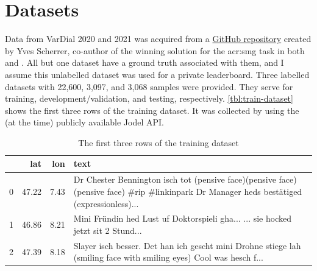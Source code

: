 \section{Datasets}
\label{sec:datasets}

Data from VarDial 2020 and 2021 was acquired from a \href{https://github.com/yvesscherrer/vardial-shared-tasks}{GitHub repository} created by Yves Scherrer, co-author of the winning solution for the \gls{acr:smg} task in both \citeyear{scherrerHeLjuVarDial20202020} and \citeyear{scherrerSocialMediaVariety2021}. All but one dataset have a ground truth associated with them, and I assume this unlabelled dataset was used for a private leaderboard. Three labelled datasets with 22,600, 3,097, and 3,068 samples were provided. They serve for training, development/validation, and testing, respectively. \autoref{tbl:train-dataset} shows the first three rows of the training dataset. It was collected by \cite[2-3]{hovyCapturingRegionalVariation2018} using the (at the time) publicly available Jodel API.

\begin{table}
    \centering
    \begin{tabular}{l|rr|p{}}
        \toprule
          & lat   & lon  & text                                                                                                                                        \\
        \midrule
        0 & 47.22 & 7.43 & Dr Chester Bennington isch tot (pensive face)(pensive face)(pensive face) \#rip \#linkinpark Dr Manager heds bestätiged (expressionless)... \\
        1 & 46.86 & 8.21 & Mini Fründin hed Lust uf Doktorspieli gha... ... sie hocked jetzt sit 2 Stund...                                                            \\
        2 & 47.39 & 8.18 & Slayer isch besser. Det han ich gescht mini Drohne stiege lah (smiling face with smiling eyes) Cool was hesch f...                          \\
        \bottomrule
    \end{tabular}
    \caption{The first three rows of the training dataset}
    \label{tbl:train-dataset}
\end{table}

